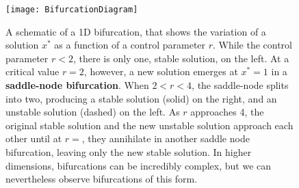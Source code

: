  \begin{figure}[h]
 \texttt{[image: BifurcationDiagram]}
 \caption{A schematic of a 1D bifurcation, that shows the variation of a solution $x^*$ as a function of a control parameter $r$. While the control parameter $r < 2$, there is only one, stable solution, on the left. At a critical value $r = 2$, however, a new solution emerges at $x^* = 1$ in a {\bf saddle-node bifurcation}. When $2 < r < 4$, the saddle-node splits into two, producing a stable solution (solid) on the right, and an unstable solution (dashed) on the left. As $r$ approaches 4, the original stable solution and the new unstable solution approach each other until at $r=$, they annihilate in another saddle node bifurcation, leaving only the new stable solution. In higher dimensions, bifurcations can be incredibly complex, but we can nevertheless observe bifurcations of this form. }\label{fig:bifurcations}
 \end{figure}
 
 